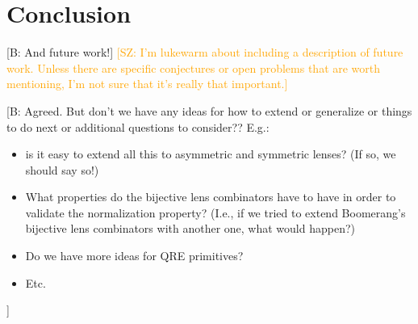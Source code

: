 \documentclass[acmsmall,review,anonymous]{acmart}
\newcommand{\FINISH}[3]{\ifdraft\textcolor{#1}{[#2: #3]}\fi}
\newcommand{\bcp}[1]{\FINISH{dkred}{B}{#1}}
\newcommand{\saz}[1]{\FINISH{orange}{SZ}{#1}}
\begin{document}
\section{Conclusion}
\bcp{And future work!}  \saz{I'm lukewarm about including a description of
future work.  Unless there are specific conjectures or open problems that
are worth mentioning, I'm not sure that it's really that important.}
\bcp{Agreed. But don't we have any ideas for how to extend or generalize or
things to do next or additional questions to consider??  E.g.: 
\begin{itemize}
\item is it easy to extend all this to
asymmetric and symmetric lenses?  (If so, we should say so!)
\item What properties do the bijective lens combinators have to have in
order to validate the normalization property?  (I.e., if we tried to extend
Boomerang's bijective lens combinators with another one, what would happen?)
\item Do we have more ideas for QRE primitives?
\item Etc.
\end{itemize}
}
\label{concl}
\end{document}
